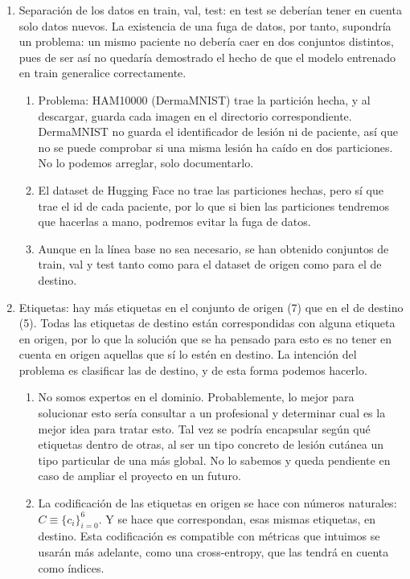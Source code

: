 \documentclass[10pt,a4paper]{article}
\renewcommand{\_}{\guionbajo\allowbreak}
\begin{document}
\begin{enumerate}
    \item Separación de los datos en train, val, test: en test se deberían tener en cuenta solo datos nuevos. 
    La existencia de una fuga de datos, por tanto, supondría un problema: un mismo paciente no debería caer en 
    dos conjuntos distintos, pues de ser así no quedaría demostrado el hecho de que el modelo entrenado en train 
    generalice correctamente. 
    \begin{enumerate}
        \item Problema: HAM10000 (DermaMNIST) trae la partición hecha, y al descargar, guarda cada imagen en el directorio 
        correspondiente. DermaMNIST no guarda el identificador de lesión ni de paciente, así que no se puede comprobar si una 
        misma lesión ha caído en dos particiones. No lo podemos arreglar, solo documentarlo.
        \item El dataset de Hugging Face no trae las particiones hechas, pero sí que trae el id de cada paciente, por lo que 
        si bien las particiones tendremos que hacerlas a mano, podremos evitar la fuga de datos. 
        \item Aunque en la línea base no sea necesario, se han obtenido conjuntos de train, val y test tanto como para el dataset
        de origen como para el de destino. 
    \end{enumerate} 
    \item Etiquetas: hay más etiquetas en el conjunto de origen (7) que en el de destino (5). Todas las etiquetas de destino están 
    correspondidas con alguna etiqueta en origen, por lo que la solución que se ha pensado para esto es no tener en cuenta en origen
    aquellas que sí lo estén en destino. La intención del problema es clasificar las de destino, y de esta forma podemos hacerlo. 
    \begin{enumerate}
        \item No somos expertos en el dominio. Probablemente, lo mejor para solucionar esto sería consultar a un profesional
        y determinar cual es la mejor idea para tratar esto. Tal vez se podría encapsular según qué etiquetas dentro de otras,
        al ser un tipo concreto de lesión cutánea un tipo particular de una más global. No lo sabemos y queda pendiente en caso 
        de ampliar el proyecto en un futuro. 
        \item La codificación de las etiquetas en origen se hace con números naturales: $C \equiv \{c_i\}_{i=0}^6$. Y se hace que 
        correspondan, esas mismas etiquetas, en destino. Esta codificación es compatible con métricas que intuimos se usarán más
        adelante, como una cross-entropy, que las tendrá en cuenta como índices.
          
    \end{enumerate} 
\end{enumerate}
\end{document}
